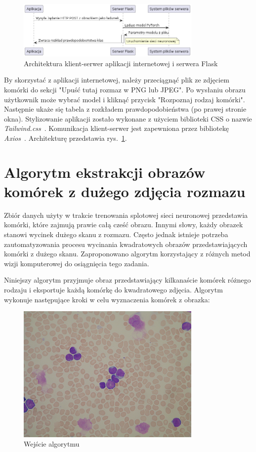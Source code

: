 \begin{figure}
    \centering
    \includegraphics[width=0.8\textwidth]{arch}
    \caption{Architektura klient-serwer aplikacji internetowej i serwera Flask}
    \label{fig:arch}
\end{figure}

By skorzystać z aplikacji internetowej, należy przeciągnąć plik ze zdjęciem komórki do sekcji "Upuść tutaj rozmaz w PNG lub JPEG".
Po wysłaniu obrazu użytkownik może wybrać model i kliknąć przycisk "Rozpoznaj rodzaj komórki".
Następnie ukaże się tabela z rozkładem prawdopodobieństwa (po prawej stronie okna).
Stylizowanie aplikacji zostało wykonane z użyciem biblioteki CSS o nazwie \textit{Tailwind.css}~\cite{tailwind}.
Komunikacja klient-serwer jest zapewniona przez bibliotekę \textit{Axios}~\cite{axios}.
Architekturę przedstawia rys.~\ref{fig:arch}.


\section{Algorytm ekstrakcji obrazów komórek z dużego zdjęcia rozmazu}\label{sec:kwadraty}

Zbiór danych użyty w trakcie trenowania splotowej sieci neuronowej przedstawia komórki, które zajmują prawie całą cześć obrazu.
Innymi słowy, każdy obrazek stanowi wycinek dużego skanu z rozmazu.
Często jednak istnieje potrzeba zautomatyzowania procesu wycinania kwadratowych obrazów przedstawiających komórki z dużego skanu.
Zaproponowano algorytm korzystający z różnych metod wizji komputerowej do osiągnięcia tego zadania.

Niniejszy algorytm przyjmuje obraz przedstawiający kilkanaście komórek różnego rodzaju i eksportuje
każdą komórkę do kwadratowego zdjęcia.
Algorytm wykonuje następujące kroki w celu wyznaczenia komórek z obrazka:

\begin{figure}
    \centering
    \includegraphics[width=0.8\textwidth]{Im060_1}
    \caption{Wejście algorytmu}
    \label{fig:extract_input}
\end{figure}

